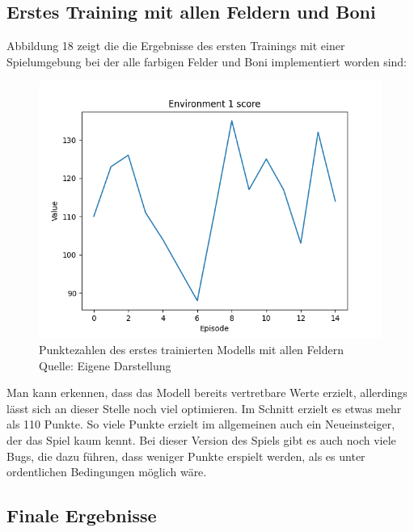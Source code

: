 \subsection{Erstes Training mit allen Feldern und Boni}
Abbildung 18 zeigt die die Ergebnisse des ersten Trainings mit einer Spielumgebung bei der alle farbigen Felder und Boni implementiert worden sind:
\nopagebreak
\begin{figure}[H]
	\includegraphics[width=1\textwidth]{Bilder/firsttrainingwithallfields} 
	\caption[Punktezahlen des erstes trainierten Modells mit allen Feldern]{Punktezahlen des erstes trainierten Modells mit allen Feldern\\ Quelle: Eigene Darstellung}
\end{figure}

Man kann erkennen, dass das Modell bereits vertretbare Werte erzielt, allerdings lässt sich an dieser Stelle noch viel optimieren. Im Schnitt erzielt es etwas mehr als 110 Punkte. So viele Punkte erzielt im allgemeinen auch ein Neueinsteiger, der das Spiel kaum kennt. Bei dieser Version des Spiels gibt es auch noch viele Bugs, die dazu führen, dass weniger Punkte erspielt werden, als es unter ordentlichen Bedingungen möglich wäre.
\subsection{Finale Ergebnisse}
